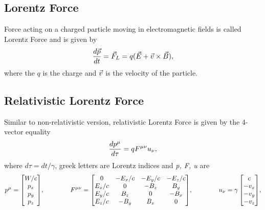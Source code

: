 \documentclass[a4paper,oneside,12pt]{report}
\numberwithin{equation}{chapter}
\begin{document}
\subsection{Lorentz Force} \label{sec:lorentz-force}
Force acting on a charged particle moving in electromagnetic fields is called Lorentz Force and is given by 
\vspace{-10pt}
\begin{equation} \label{eq:lf}
    \frac{d \vecthree{p}}{d t} = \vecthree{F}_L=q(\vecthree{E}+ \vecthree{v} \times \vecthree{B}) , 
    \vspace{-10pt}
\end{equation}
where the $q$ is the charge and $\vec{v}$ is the velocity of the particle. 

\subsection{Relativistic Lorentz Force}
Similar to non-relativistic version, relativistic Lorentz Force is given by the 4-vector equality
\vspace{-10pt}
\begin{equation}
    \frac{d p^{\mu}}{d \tau} = q F^{\mu \nu} u_{\nu} ,
    \vspace{-10pt}
\end{equation}
where $ d \tau = d t / \gamma $, greek letters are Lorentz indices and \textit{p, F, u} are
\vspace{-10pt}
\begin{equation*}
    \begin{aligned}
        p^{\mu} = 
        \begin{bmatrix}
            W/c \\
            p_x \\
            p_y \\
            p_z
        \end{bmatrix}    
    \end{aligned} ,
    \qquad\qquad
    \begin{aligned}
        F^{\mu\nu} = 
        \begin{bmatrix}
                0       & -E_x/c   & -E_y/c    & -E_z/c \\
                E_x/c   &   0      & -B_z      & B_y    \\
                E_y/c   &   B_z    &  0        & -B_x   \\
                E_z/c   &   -B_y   & B_x       & 0   
        \end{bmatrix} 
    \end{aligned} ,
    \qquad\qquad
    \begin{aligned}
        u_{\nu} = \gamma
        \begin{bmatrix}
                 c \\
                -v_x \\
                -v_y \\
                -v_z \\
        \end{bmatrix} 
    \end{aligned} ,
    \vspace{-10pt}
\end{equation*}
\end{document}
